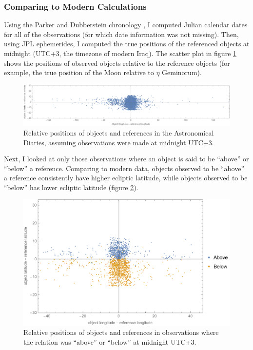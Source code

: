 \documentclass{article}
\begin{document}

\subsubsection{Comparing to Modern Calculations}
Using the Parker and Dubberstein chronology \autocite{parkerDubberstein}, I computed Julian calendar dates for all of the observations (for which date information was not missing). Then, using JPL ephemerides, I computed the true positions of the referenced objects at midnight (UTC+3, the timezone of modern Iraq). The scatter plot in figure \ref{fig:scatter} shows the positions of observed objects relative to the reference objects (for example, the true position of the Moon relative to $\eta$ Geminorum).

\begin{figure}[h]
    \centering
    \includegraphics[width=\linewidth]{relativePositions.pdf}
    \caption{Relative positions of objects and references in the Astronomical Diaries, assuming observations were made at midnight UTC+3.}
    \label{fig:scatter}
\end{figure}

Next, I looked at only those observations where an object is said to be ``above'' or ``below'' a reference. Comparing to modern data, objects observed to be ``above'' a reference consistently have higher ecliptic latitude, while objects observed to be ``below'' has lower ecliptic latitude (figure \ref{fig:scatterAboveBelow}).

\begin{figure}[h]
    \centering
    \includegraphics[width=0.7\linewidth]{aboveBelowScatter.pdf}
    \caption{Relative positions of objects and references in observations where the relation was ``above'' or ``below'' at midnight UTC+3.}
    \label{fig:scatterAboveBelow}
\end{figure}
\end{document}
